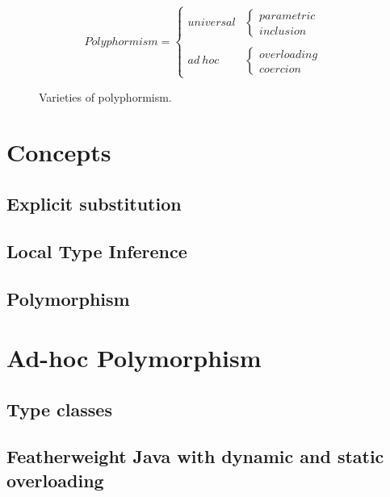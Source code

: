 \documentclass{article}
\begin{document}
                                                                                                                                                                                                                                                                                                                                                                                                                                                                                                                                                                                                                                                                                                                                                                                                                                           
\begin{figure}
\begin{center}
\[ Polyphormism = 
\begin{cases} 
     universal & 
     \begin{cases} 
     	parametric &\\
     	inclusion &
   	\end{cases} \\
		 & \\
     ad \ hoc & 
     \begin{cases} 
     	overloading & \\
     	coercion &
   	\end{cases}
 \end{cases}
\]
\caption{Varieties of polyphormism.}
\label{figure:varpolyphormism}
\end{center}
\end{figure}



\section{Concepts}\label{section:concepts}
\subsection{Explicit substitution}
\subsection{Local Type Inference}
\subsection{Polymorphism}
\section{Ad-hoc Polymorphism}\label{section:polymorphism}
\subsection{Type classes}
\subsection{Featherweight Java with dynamic and static overloading}

\medskip 


\end{document}
